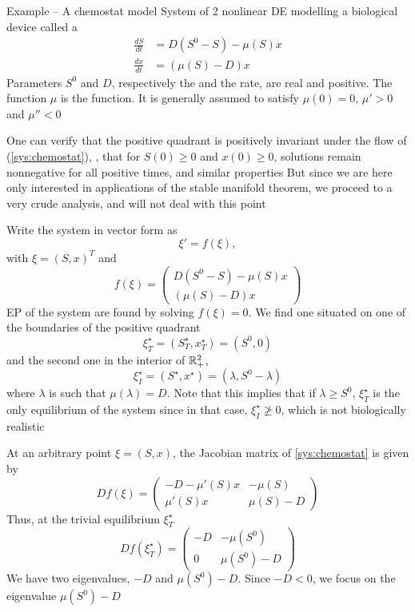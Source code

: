 \documentclass[aspectratio=169]{beamer}
\begin{document}
\begin{frame}{Example -- A chemostat model}
System of 2 nonlinear DE modelling a biological device called a 
\begin{subequations}
\label{sys:chemostat}
\begin{align}
\frac{dS}{dt} &= D\left(S^0-S\right)-\mu(S)x \label{sys:chemostatS} \\
\frac{dx}{dt} &= (\mu(S)-D)x \label{sys:chemostatx}
\end{align}
\end{subequations}
\vfill
Parameters $S^0$ and $D$, respectively the  and the  rate, are real and positive.
The function $\mu$ is the  function. It is generally
assumed to satisfy $\mu(0)=0$, $\mu'>0$ and $\mu''<0$
\end{frame}

\begin{frame}
One can verify that the positive quadrant is
positively invariant under the flow of (\ref{sys:chemostat}),
\ie, that for $S(0)\geq 0$ and $x(0)\geq 0$, solutions remain nonnegative for all positive times, and similar properties
\vfill
But since we are here only interested in applications of the stable
manifold theorem, we proceed to a very crude analysis, and will not
deal with this point
\end{frame}

\begin{frame}
Write the system in vector form as
\[
\xi'=f(\xi),
\]
with $\xi=(S,x)^T$ and
\[
f(\xi)=
\begin{pmatrix}
D(S^0-S)-\mu(S)x \\
(\mu(S)-D)x
\end{pmatrix}
\]
EP of the system are found by solving $f(\xi)=0$. We find one situated on one of the boundaries of the positive quadrant
\[
\xi_T^\star=(S^\star_T,x^\star_T)=\left(S^0,0\right)
\]
and the second one in the interior of $\mathbb{R}_+^2$,
\[
\xi_I^\star=(S^\star,x^\star)=\left(\lambda,S^0-\lambda\right)
\]
where $\lambda$ is such that $\mu(\lambda)=D$. Note that this implies
that if $\lambda\geq S^0$, $\xi_T^\star$ is the only equilibrium of the
system since in that case, $\xi_I^\star\not\geq 0$, which is not biologically realistic
\end{frame}

\begin{frame}
At an arbitrary point $\xi=(S,x)$, the Jacobian matrix of \eqref{sys:chemostat} is given by
\[
Df(\xi)=\left(
\begin{matrix}
-D-\mu'(S)x & -\mu(S) \\
\mu'(S)x & \mu(S)-D
\end{matrix}
\right)
\]
\vfill
Thus, at the trivial equilibrium $\xi_T^\star$
\[
Df(\xi_T^\star)=
\left(
\begin{matrix}
-D & -\mu(S^0) \\
0 & \mu(S^0)-D
\end{matrix}
\right)
\]
\vfill
We have two eigenvalues, $-D$ and $\mu(S^0)-D$.
Since $-D<0$, we focus on the eigenvalue $\mu(S^0)-D$
\end{frame}
\end{document}
